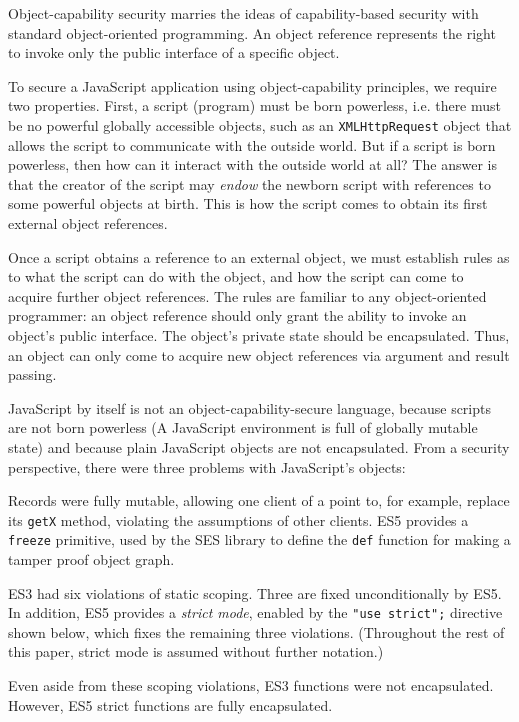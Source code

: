 \documentclass{llncs}
\begin{document}
Object-capability security marries the ideas of capability-based security with standard object-oriented programming. An object reference represents the right to invoke only the public interface of a specific object.

To secure a JavaScript application using object-capability principles, we require two properties. First, a script (program) must be born powerless, i.e. there must be no powerful globally accessible objects, such as an {\tt XMLHttpRequest} object that allows the script to communicate with the outside world. But if a script is born powerless, then how can it interact with the outside world at all? The answer is that the creator of the script may \emph{endow} the newborn script with references to some powerful objects at birth. This is how the script comes to obtain its first external object references.

Once a script obtains a reference to an external object, we must establish rules as to what the script can do with the object, and how the script can come to acquire further object references. The rules are familiar to any object-oriented programmer: an object reference should only grant the ability to invoke an object's public interface. The object's private state should be encapsulated. Thus, an object can only come to acquire new object references via argument and result passing.

JavaScript by itself is not an object-capability-secure language, because scripts are not born powerless (A JavaScript environment is full of globally mutable state) and because plain JavaScript objects are not encapsulated. From a security perspective, there were three problems with JavaScript's objects:

\begin{itemize*}
\item Records were fully mutable, allowing one client of a point to, for example, replace its {\tt getX} method, violating the assumptions of other clients. ES5 provides a {\tt freeze} primitive, used by the SES library to define the {\tt def} function for making a tamper proof object graph.
\item ES3 had six violations of static scoping. Three are fixed unconditionally by ES5. In addition, ES5 provides a \emph{strict mode}, enabled by the {\tt "use strict";} directive shown below, which fixes the remaining three violations. (Throughout the rest of this paper, strict mode is assumed without further notation.)  
\item Even aside from these scoping violations, ES3 functions were not encapsulated. However, ES5 strict functions are fully encapsulated.
\end{itemize*}
\end{document}
